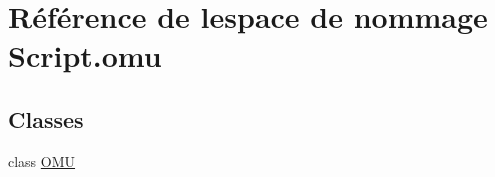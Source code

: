 \hypertarget{namespaceScript_1_1omu}{}\section{Référence de l\textquotesingle{}espace de nommage Script.\+omu}
\label{namespaceScript_1_1omu}
\subsection*{Classes}
\begin{DoxyCompactItemize}
\item 
class \hyperlink{classScript_1_1omu_1_1OMU}{O\+MU}
\end{DoxyCompactItemize}
